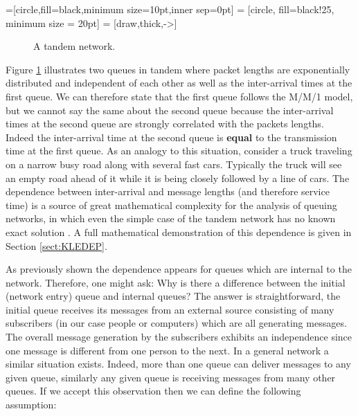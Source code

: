 
=[circle,fill=black,minimum size=10pt,inner sep=0pt]
 = [circle, fill=black!25, minimum size = 20pt]
 = [draw,thick,->]

\begin{figure}[htbp!]
\begin{center}
\caption{A tandem network.}
\label{fig:tandem}
\end{center}
\end{figure}


Figure \ref{fig:tandem} illustrates two queues in tandem where packet lengths are exponentially distributed and independent of each other as well as the inter-arrival times at the first queue. We can therefore state that the first queue follows the M/M/1 model, but we cannot say the same about the second queue because the inter-arrival times at the second queue are strongly correlated with the packets lengths. Indeed the inter-arrival time at the second queue is \textbf{equal} to the transmission time at the first queue. As an analogy to this situation, consider a truck traveling on a narrow busy road along with several fast cars. Typically the truck will see an empty road ahead of it while it is being closely followed by a line of cars. The dependence between inter-arrival and message lengths (and therefore service time) is a source of great mathematical complexity for the analysis of queuing networks, in which even the simple case of the tandem network has no known exact solution \cite{DataNetworks}. A full mathematical demonstration of this dependence is given in Section \ref{sect:KLEDEP}.

As previously shown the dependence appears for queues which are internal to the network. Therefore, one might ask: Why is there a difference between the initial (network entry) queue and internal queues? The answer is straightforward, the initial queue receives its messages from an external source consisting of many subscribers (in our case people or computers) which are all generating messages. The overall message generation by the subscribers exhibits an independence \cite{CommNets} since one message is different from one person to the next. In a general network a similar situation exists. Indeed, more than one queue can deliver messages to any given queue, similarly any given queue is receiving messages from many other queues. If we accept this observation then we can define the following assumption:

